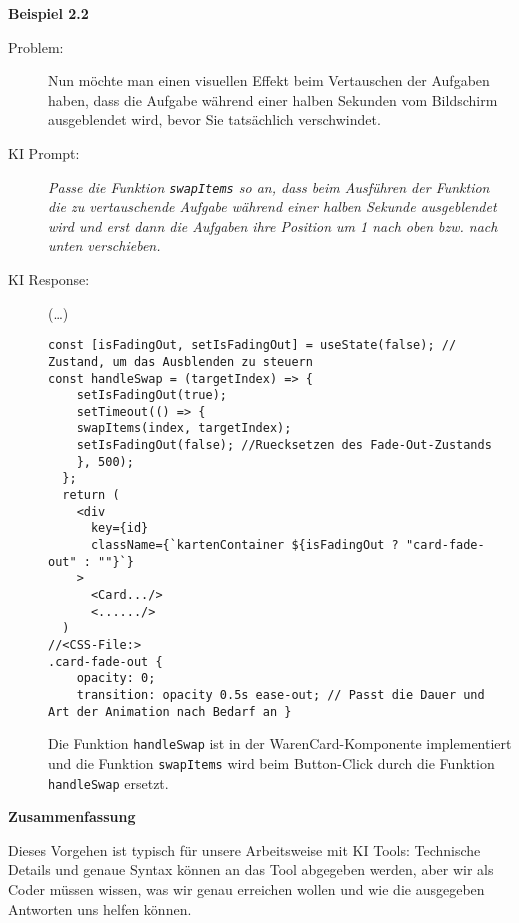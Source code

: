 \textbf{Beispiel 2.2} 
\begin{description}
    \item[Problem:] 
Nun möchte man einen visuellen Effekt beim Vertauschen der Aufgaben haben, dass die Aufgabe während einer halben Sekunden vom Bildschirm ausgeblendet wird, bevor Sie tatsächlich verschwindet. 
\item[KI Prompt:] \emph{Passe die Funktion \texttt{swapItems} so an, dass beim Ausführen der Funktion die zu vertauschende Aufgabe während einer halben Sekunde ausgeblendet wird und erst dann die Aufgaben ihre Position um 1 nach oben bzw. nach unten verschieben. }

\item[KI Response:] (\ldots)
\begin{lstlisting}
const [isFadingOut, setIsFadingOut] = useState(false); // Zustand, um das Ausblenden zu steuern
const handleSwap = (targetIndex) => {
    setIsFadingOut(true);
    setTimeout(() => {
    swapItems(index, targetIndex);
    setIsFadingOut(false); //Ruecksetzen des Fade-Out-Zustands
    }, 500);
  };
  return (
    <div
      key={id}
      className={`kartenContainer ${isFadingOut ? "card-fade-out" : ""}`}
    >
      <Card.../>
      <....../>
  )
//<CSS-File:>
.card-fade-out {
    opacity: 0;
    transition: opacity 0.5s ease-out; // Passt die Dauer und Art der Animation nach Bedarf an }

\end{lstlisting}

Die Funktion \texttt{handleSwap} ist in der WarenCard-Komponente implementiert und die Funktion \texttt{swapItems} wird beim Button-Click durch die Funktion \texttt{handleSwap} ersetzt.
\end{description}

\textbf{Zusammenfassung}

Dieses Vorgehen ist typisch für unsere Arbeitsweise mit KI Tools: Technische Details und genaue Syntax können an das Tool abgegeben werden, aber wir als Coder müssen wissen, was wir genau erreichen wollen und wie die ausgegeben Antworten uns helfen können. 